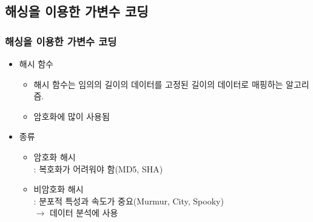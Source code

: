 \documentclass{beamer}
\begin{document}
\subsection{해싱을 이용한 가변수 코딩} %

\begin{frame}
\frametitle{해싱을 이용한 가변수 코딩}
\begin{itemize}
    \item 해시 함수
    {\footnotesize
    \begin{itemize}
    [circle]
    \item 해시 함수는 임의의 길이의 데이터를 고정된 길이의 데이터로 매핑하는 알고리즘.
    \item 암호화에 많이 사용됨
    \end{itemize}
    }

    \item 종류
    {\footnotesize
    \begin{itemize}
    [circle]
    \item 암호화 해시
        \\: 복호화가 어려워야 함(MD5, SHA)
    \item 비암호화 해시
        \\: 분포적 특성과 속도가 중요(Murmur, City, Spooky)
        \\\quad $\rightarrow$ 데이터 분석에 사용
    \end{itemize}
    }
\end{itemize}
\end{frame}
\end{document}
